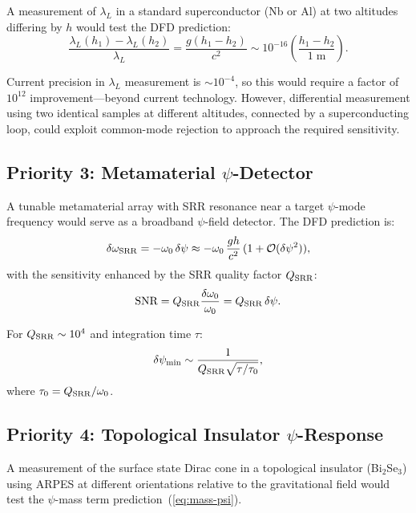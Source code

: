 \documentclass[aps,prb,twocolumn,superscriptaddress,floatfix,nofootinbib,longbibliography]{revtex4-2}
\newcommand{\order}[1]{\mathcal{O}(#1)}
\begin{document}
A measurement of $\lambda_L$ in a standard superconductor (Nb or Al)
at two altitudes differing by $h$ would test the DFD prediction:
\begin{equation}
\frac{\lambda_L(h_1) - \lambda_L(h_2)}{\lambda_L}
= \frac{g(h_1 - h_2)}{c^2} \sim 10^{-16}\left(\frac{h_1 - h_2}{1\;\text{m}}\right).
\label{eq:lambda-altitude}
\end{equation}

Current precision in $\lambda_L$ measurement is $\sim 10^{-4}$, so this
would require a factor of $10^{12}$ improvement---beyond current
technology.  However, differential measurement using two identical samples
at different altitudes, connected by a superconducting loop, could exploit
common-mode rejection to approach the required sensitivity.

\subsection{Priority 3: Metamaterial $\psi$-Detector}

A tunable metamaterial array with SRR resonance near a target $\psi$-mode
frequency would serve as a broadband $\psi$-field detector.  The DFD
prediction is:
\begin{equation}
\delta\omega_{\rm SRR} = -\omega_0\,\delta\psi
\approx -\omega_0\,\frac{g h}{c^2}\,(1 + \order{\delta\psi^2}),
\label{eq:srr-detect}
\end{equation}
with the sensitivity enhanced by the SRR quality factor $Q_{\rm SRR}$:
\begin{equation}
\text{SNR} = Q_{\rm SRR}\frac{\delta\omega_0}{\omega_0}
= Q_{\rm SRR}\,\delta\psi.
\label{eq:srr-snr}
\end{equation}

For $Q_{\rm SRR} \sim 10^4$ and integration time $\tau$:
\begin{equation}
\delta\psi_{\rm min} \sim \frac{1}{Q_{\rm SRR}\sqrt{\tau/\tau_0}},
\label{eq:psi-min}
\end{equation}
where $\tau_0 = Q_{\rm SRR}/\omega_0$.

\subsection{Priority 4: Topological Insulator $\psi$-Response}

A measurement of the surface state Dirac cone in a topological
insulator (Bi$_2$Se$_3$) using ARPES at different orientations
relative to the gravitational field would test the $\psi$-mass term
prediction~(\ref{eq:mass-psi}).
\end{document}
